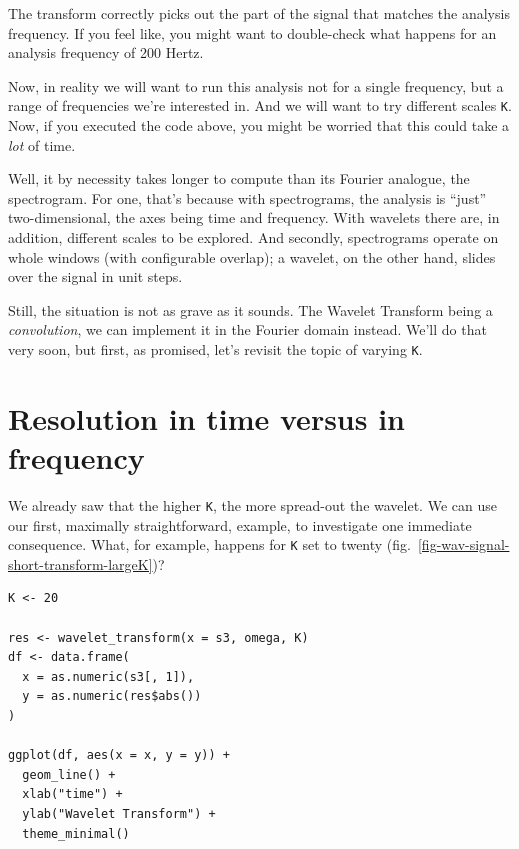 \documentclass[
  letterpaper,
]{krantz}
\begin{document}
The transform correctly picks out the part of the signal that matches
the analysis frequency. If you feel like, you might want to double-check
what happens for an analysis frequency of 200 Hertz.

Now, in reality we will want to run this analysis not for a single
frequency, but a range of frequencies we're interested in. And we will
want to try different scales \texttt{K}. Now, if you executed the code
above, you might be worried that this could take a \emph{lot} of time.

Well, it by necessity takes longer to compute than its Fourier analogue,
the spectrogram. For one, that's because with spectrograms, the analysis
is ``just'' two-dimensional, the axes being time and frequency. With
wavelets there are, in addition, different scales to be explored. And
secondly, spectrograms operate on whole windows (with configurable
overlap); a wavelet, on the other hand, slides over the signal in unit
steps.

Still, the situation is not as grave as it sounds. The Wavelet Transform
being a \emph{convolution}, we can implement it in the Fourier domain
instead. We'll do that very soon, but first, as promised, let's revisit
the topic of varying \texttt{K}.

\hypertarget{resolution-in-time-versus-in-frequency}{%
\section{Resolution in time versus in
frequency}\label{resolution-in-time-versus-in-frequency}}

We already saw that the higher \texttt{K}, the more spread-out the
wavelet. We can use our first, maximally straightforward, example, to
investigate one immediate consequence. What, for example, happens for
\texttt{K} set to twenty
(fig.~\ref{fig-wav-signal-short-transform-largeK})?

\begin{verbatim}
K <- 20

res <- wavelet_transform(x = s3, omega, K)
df <- data.frame(
  x = as.numeric(s3[, 1]),
  y = as.numeric(res$abs())
)

ggplot(df, aes(x = x, y = y)) +
  geom_line() +
  xlab("time") +
  ylab("Wavelet Transform") +
  theme_minimal()
\end{verbatim}
\end{document}
